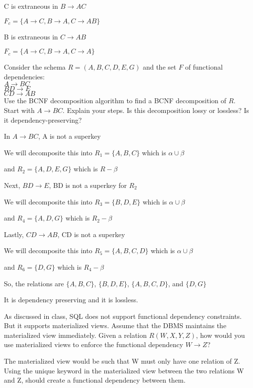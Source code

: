 \documentclass[a4 paper]{article}
\begin{document}
C is extraneous in $B \rightarrow AC$

$F_c = \{A \rightarrow C, B \rightarrow A, C \rightarrow AB\}$

B is extraneous in $C \rightarrow AB$

$F_c = \{A \rightarrow C, B \rightarrow A, C \rightarrow A\}$


Consider the schema $R = (A, B, C, D, E, G)$ and the set $F$ of functional dependencies:\\
$A \rightarrow BC$\\
$BD \rightarrow E$\\
$CD \rightarrow AB$\\
Use the BCNF decomposition algorithm to find a BCNF decomposition
of $R$. Start with $A \rightarrow BC$. Explain your steps. Is this decomposition lossy or lossless? Is it dependency-preserving?

In $A \rightarrow BC$, A is not a superkey

We will decomposite this into $R_1 = \{A,B,C\}$ which is $\alpha \cup \beta$ 

and $R_2 = \{A,D,E,G\}$ which is $R - \beta$

Next, $BD \rightarrow E$, BD is not a superkey for $R_2$

We will decomposite this into $R_3 = \{B,D,E\}$ which is $\alpha \cup \beta$ 

and $R_4 = \{A,D,G\}$ which is $R_2 - \beta$

Lastly, $CD \rightarrow AB$, CD is not a superkey

We will decomposite this into $R_5 = \{A,B,C,D\}$ which is $\alpha \cup \beta$ 

and $R_6 = \{D,G\}$ which is $R_4 - \beta$


So, the relations are $\{A,B,C\}$, $\{B,D,E\}$, $\{A,B,C,D\}$, and $\{D,G\}$

It is dependency preserving and it is lossless.

As discussed in class, SQL does not support functional dependency constraints. But it supports materialized views. Assume that the DBMS maintains the materialized view immediately. Given a relation $R(W, X, Y, Z)$, how would you use materialized views to enforce the functional dependency $W \rightarrow Z$?

The materialized view would be such that W must only have one relation of Z. Using the unique keyword in the materialized view between the two relations W and Z,
should create a functional dependency between them. 
\end{document}
